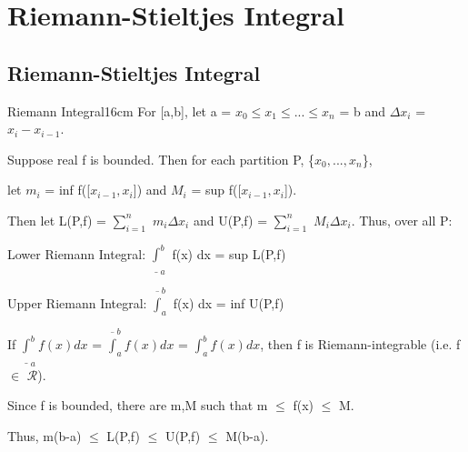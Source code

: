 \newpage
\section[Day 13: Riemann-Stieltjes Integral]{ Riemann-Stieltjes Integral }

\subsection{ Riemann-Stieltjes Integral }

    \begin{definition}{Riemann Integral}{16cm}
        For [a,b], let a = $x_0 \leq x_1 \leq ... \leq x_n$ = b
        and $\Delta x_i$ = $x_i - x_{i-1}$.

        Suppose real f is bounded.
        Then for each partition P, \{$x_0 , ... , x_n$\},

        let $m_i$ = inf f([$x_{i-1},x_i$]) and $M_i$ = sup f([$x_{i-1},x_i$]).
        
        Then let L(P,f) = $\sum_{i=1}^n$ $m_i \Delta x_i$
        and U(P,f) = $\sum_{i=1}^n$ $M_i \Delta x_i$. Thus, over all P:

        \hspace{0.5cm}
        Lower Riemann Integral:
        $\underline{\int}_a^b$ f(x) dx = sup L(P,f)

        \hspace{0.5cm}
        Upper Riemann Integral:
        $\overline{\int}_a^b$ f(x) dx = inf U(P,f)

        \vspace{0.2cm}

        If $\underline{\int}_a^b f(x) dx$
        = $\overline{\int}_a^b f(x) dx$ = $\int_a^b f(x) dx$, then
        f is {\color{lblue} Riemann-integrable}
        (i.e. f $\in$ $\mathscr{R}$).
        
        \vspace{0.2cm}

        Since f is bounded, there are m,M such that m $\leq$ f(x) $\leq$ M.

        Thus, m(b-a) $\leq$ L(P,f) $\leq$ U(P,f) $\leq$ M(b-a).
    \end{definition}



